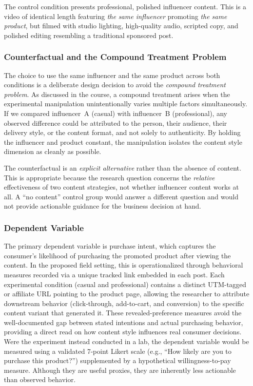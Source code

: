 \documentclass[10pt]{article}
\begin{document}
The control condition presents professional, polished influencer content. This is a video of identical length featuring \textit{the same influencer} promoting \textit{the same product}, but filmed with studio lighting, high-quality audio, scripted copy, and polished editing resembling a traditional sponsored post.
\newpage 
\subsubsection{Counterfactual and the Compound Treatment Problem}
The choice to use the same influencer and the same product across both conditions is a deliberate design decision to avoid the \textit{compound treatment problem}. As discussed in the course, a compound treatment arises when the experimental manipulation unintentionally varies multiple factors simultaneously. If we compared influencer~A (casual) with influencer~B (professional), any observed difference could be attributed to the person, their audience, their delivery style, or the content format, and not solely to authenticity. By holding the influencer and product constant, the manipulation isolates the content style dimension as cleanly as possible.

The counterfactual is an \textit{explicit alternative} rather than the absence of content. This is appropriate because the research question concerns the \textit{relative} effectiveness of two content strategies, not whether influencer content works at all. A ``no content'' control group would answer a different question and would not provide actionable guidance for the business decision at hand.
\subsubsection{Dependent Variable}
The primary dependent variable is purchase intent, which captures the consumer's likelihood of purchasing the promoted product after viewing the content. In the proposed field setting, this is operationalized through behavioral measures recorded via a unique tracked link embedded in each post. Each experimental condition (casual and professional) contains a distinct UTM-tagged or affiliate URL pointing to the product page, allowing the researcher to attribute downstream behavior (click-through, add-to-cart, and conversion) to the specific content variant that generated it. These revealed-preference measures avoid the well-documented gap between stated intentions and actual purchasing behavior, providing a direct read on how content style influences real consumer decisions. Were the experiment instead conducted in a lab, the dependent variable would be measured using a validated 7-point Likert scale (e.g., ``How likely are you to purchase this product?'') supplemented by a hypothetical willingness-to-pay measure. Although they are useful proxies, they are inherently less actionable than observed behavior.
\end{document}
